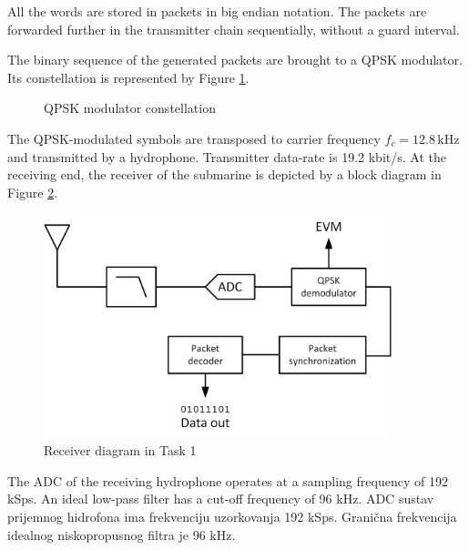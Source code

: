 \documentclass[a4paper]{article}
\begin{document}
All the words are stored in packets in big endian notation. The packets are forwarded further in the transmitter chain sequentially, without a guard interval.

The binary sequence of the generated packets are brought to a QPSK modulator. Its constellation is represented by Figure \ref{fig:qpsk}.

\begin{figure}[h!]
\centering
{}
\caption{QPSK modulator constellation}
\label{fig:qpsk}
\end{figure}

The QPSK-modulated symbols are transposed to carrier frequency $f_c = 12.8 \,\textrm{kHz}$ and transmitted by a hydrophone. Transmitter data-rate is 19.2 kbit/s. At the receiving end, the receiver of the submarine is depicted by a block diagram in Figure \ref{fig:task1}.

\begin{figure}[h!]
\centering
\includegraphics[width=0.9\textwidth]{Task1.png}
\caption{Receiver diagram in Task 1}
\label{fig:task1}
\end{figure}

The ADC of the receiving hydrophone operates at a sampling frequency of 192 kSps. An ideal low-pass filter has a cut-off frequency of 96 kHz.
ADC sustav prijemnog hidrofona ima frekvenciju uzorkovanja 192 kSps. Granična frekvencija idealnog niskopropusnog filtra je 96 kHz.
\end{document}
